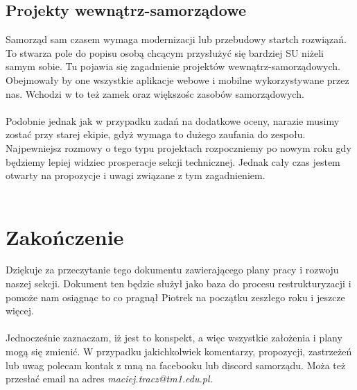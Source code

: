 \documentclass[9pt,a4paper]{report}
\begin{document}
\section{Projekty wewnątrz-samorządowe}

Samorząd sam czasem wymaga modernizacji lub przebudowy startch rozwiązań. To stwarza pole do popisu osobą chcącym przysłużyć się bardziej SU niżeli samym sobie. Tu pojawia się zagadnienie projektów wewnątrz-samorządowych. Obejmowały by one wszystkie aplikacje webowe i mobilne wykorzystywane przez nas. Wchodzi w to też zamek oraz większośc zasobów samorządowych.\\\\
Podobnie jednak jak w przypadku zadań na dodatkowe oceny, narazie musimy zostać przy starej ekipie, gdyż wymaga to dużego zaufania do zespołu. Najpewniejsz rozmowy o tego typu projektach rozpoczniemy po nowym roku gdy będziemy lepiej widziec prosperacje sekcji technicznej. Jednak cały czas jestem otwarty na propozycje i uwagi związane z tym zagadnieniem.\\\\

\chapter{Zakończenie}

Dziękuje za przeczytanie tego dokumentu zawierającego plany pracy i rozwoju naszej sekcji. Dokument ten będzie służył jako baza do procesu restrukturyzacji i pomoże nam osiągnąc to co pragnął Piotrek na początku zeszłego roku i jeszcze więcej.\\\\

Jednocześnie zaznaczam, iż jest to konspekt, a więc wszystkie założenia i plany mogą się zmienić. W przypadku jakichkolwiek komentarzy, propozycji, zastrzeżeń lub uwag polecam kontak z mną na facebooku lub discord samorządu. Moża też przesłać email na adres \textit{maciej.tracz@tm1.edu.pl. }\\\\
\end{document}
